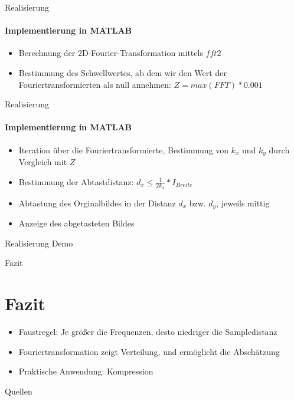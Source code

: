 \documentclass{beamer}
\begin{document}
	\begin{frame}{Realisierung}
	\framesubtitle{Implementierung in MATLAB}
	\begin{itemize}
		\item Berechnung der 2D-Fourier-Transformation mittels $fft2$
		\item Bestimmung des \dq Schwellwertes\dq, ab dem wir den Wert der Fouriertransformierten als null annehmen: $Z = max(FFT)*0.001$	
	\end{itemize}

	\end{frame}

	\begin{frame}{Realisierung}
	\framesubtitle{Implementierung in MATLAB}
	\begin{itemize}
	\item Iteration über die Fouriertransformierte, Bestimmung von $k_x$ und $k_y$ durch Vergleich mit $Z$
	\item Bestimmung der Abtastdistanz: $d_x\leq \frac{1}{2k_x}*I_{Breite}$
	\item Abtastung des Orginalbildes in der Distanz $d_x$ bzw. $d_y$, jeweils mittig
	\item Anzeige des abgetasteten Bildes
	\end{itemize}

	\end{frame}
	\begin{frame}{Realisierung}
	Demo
	\end{frame}
	\begin{frame}{Fazit}
	\section{Fazit}
	\begin{itemize}
		\item Faustregel: Je größer die Frequenzen, desto niedriger die Sampledistanz
		\item Fouriertransformation zeigt Verteilung, und ermöglicht die Abschätzung
		\item Praktische Anwendung: Kompression
	\end{itemize}
	\end{frame}
	
	\begin{frame}{Quellen}
		\begin{multicols}{2}
		\tiny{
			
			
		}
		\end{multicols}
	\end{frame}
	
\end{document}
